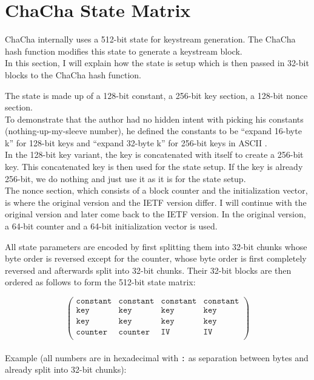 \section{ChaCha State Matrix}
\label{sec:chacha.matrix}

ChaCha internally uses a 512-bit state for keystream generation. The ChaCha hash function modifies this state to generate a keystream block. \\
In this section, I will explain how the state is setup which is then passed in 32-bit blocks to the ChaCha hash function.

The state is made up of a 128-bit constant, a 256-bit key section, a 128-bit nonce section. \\
To demonstrate that the author had no hidden intent with picking his constants (nothing-up-my-sleeve number), he defined the constants to be ``expand 16-byte k'' for 128-bit keys and ``expand 32-byte k'' for 256-bit keys in ASCII .\\
In the 128-bit key variant, the key is concatenated with itself to create a 256-bit key. This concatenated key is then used for the state setup. If the key is already 256-bit, we do nothing and just use it as it is for the state setup.\\
The nonce section, which consists of a block counter and the initialization vector, is where the original version and the IETF version differ. I will continue with the original version and later come back to the IETF version. In the original version, a 64-bit counter and a 64-bit initialization vector is used.

All state parameters are encoded by first splitting them into 32-bit chunks whose byte order is reversed except for the counter, whose byte order is first completely reversed and afterwards split into 32-bit chunks. Their 32-bit blocks are then ordered as follows to form the 512-bit state matrix:

\begin{equation*}
\begin{pmatrix}
\texttt{constant}& \texttt{constant} & \texttt{constant} & \texttt{constant} \\
\texttt{key} & \texttt{key} & \texttt{key} & \texttt{key} \\
\texttt{key} & \texttt{key} & \texttt{key} & \texttt{key} \\
\texttt{counter} & \texttt{counter} & \texttt{IV} & \texttt{IV} \\
\end{pmatrix}
\end{equation*}
\\
\noindent Example (all numbers are in hexadecimal with \texttt{:} as separation between bytes and already split into 32-bit chunks):\\

